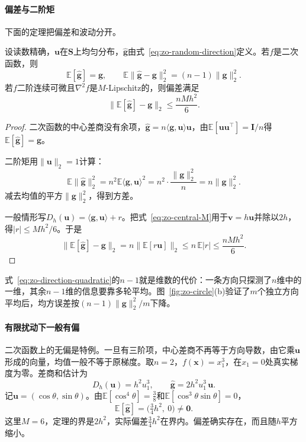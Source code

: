 \paragraph{偏差与二阶矩}
下面的定理把偏差和波动分开。

\begin{theorem}[随机方向差分]
\label{thm:zo-random-direction}
设读数精确，$\bm{u}$在$\bm{S}$上均匀分布，$\hat{\bm{g}}$由式~\eqref{eq:zo-random-direction}定义。若$f$是二次函数，则
\begin{equation}
 \mathbb{E}[\hat{\bm{g}}]=\bm{g},\qquad
 \mathbb{E}\lVert\hat{\bm{g}}-\bm{g}\rVert_2^2=(n-1)\lVert\bm{g}\rVert_2^2.
 \label{eq:zo-direction-quadratic}
\end{equation}
若$f$二阶连续可微且$\nabla^2f$是$M$-Lipschitz的，则偏差满足
\begin{equation}
 \bigl\lVert\mathbb{E}[\hat{\bm{g}}]-\bm{g}\bigr\rVert_2\leq\frac{nMh^2}{6}.
 \label{eq:zo-direction-bias}
\end{equation}
\end{theorem}

\begin{proof}
二次函数的中心差商没有余项，$\hat{\bm{g}}=n\langle\bm{g},\bm{u}\rangle\bm{u}$，由$\mathbb{E}[\bm{u}\bm{u}^\top]=\bm{I}/n$得$\mathbb{E}[\hat{\bm{g}}]=\bm{g}$。

二阶矩用$\lVert\bm{u}\rVert_2=1$计算：
\[
 \mathbb{E}\lVert\hat{\bm{g}}\rVert_2^2=n^2\mathbb{E}\langle\bm{g},\bm{u}\rangle^2=n^2\cdot\frac{\lVert\bm{g}\rVert_2^2}{n}=n\lVert\bm{g}\rVert_2^2.
\]
减去均值的平方$\lVert\bm{g}\rVert_2^2$，得到方差。

一般情形写$D_h(\bm{u})=\langle\bm{g},\bm{u}\rangle+r$。把式~\eqref{eq:zo-central-M}用于$\bm{v}=h\bm{u}$并除以$2h$，得$\lvert r\rvert\leq Mh^2/6$。于是
\[
 \bigl\lVert\mathbb{E}[\hat{\bm{g}}]-\bm{g}\bigr\rVert_2=n\bigl\lVert\mathbb{E}[r\bm{u}]\bigr\rVert_2\leq n\,\mathbb{E}\lvert r\rvert\leq\frac{nMh^2}{6}.
\]
\end{proof}

式~\eqref{eq:zo-direction-quadratic}的$n-1$就是维数的代价：一条方向只探测了$n$维中的一维，其余$n-1$维的信息要靠多轮平均。图~\ref{fig:zo-circle}(b)验证了$m$个独立方向平均后，均方误差按$(n-1)\lVert\bm{g}\rVert_2^2/m$下降。

\paragraph{有限扰动下一般有偏}
二次函数上的无偏是特例。一旦有三阶项，中心差商不再等于方向导数，由它乘$\bm{u}$形成的向量，均值一般不等于原梯度。取$n=2$，$f(\bm{x})=x_1^3$，在$x_1=0$处真实梯度为零。差商和估计为
\[
 D_h(\bm{u})=h^2u_1^3,\qquad\hat{\bm{g}}=2h^2u_1^3\,\bm{u}.
\]
记$\bm{u}=(\cos\theta,\sin\theta)$。由$\mathbb{E}[\cos^4\theta]=\tfrac38$和$\mathbb{E}[\cos^3\theta\sin\theta]=0$，
\[
 \mathbb{E}[\hat{\bm{g}}]=\bigl(\tfrac34h^2,\ 0\bigr)\neq\bm{0}.
\]
这里$M=6$，定理的界是$2h^2$，实际偏差$\tfrac34h^2$在界内。偏差确实存在，而且随$h$平方缩小。

